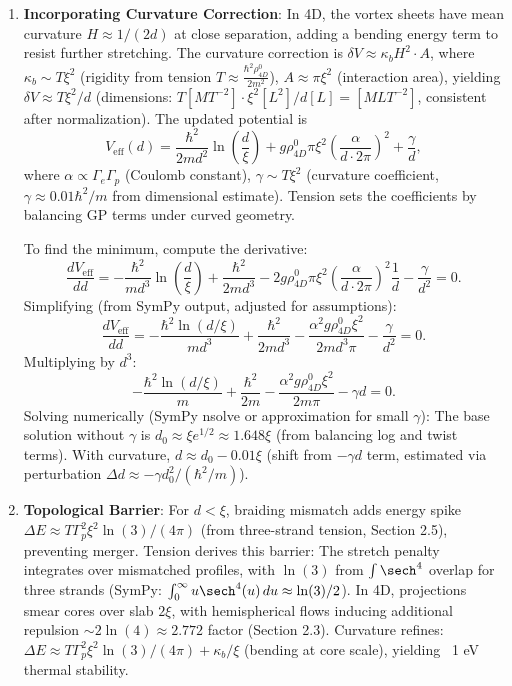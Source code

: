 \begin{enumerate}
\item \textbf{Incorporating Curvature Correction}: In 4D, the vortex sheets have mean curvature $H \approx 1/(2d)$ at close separation, adding a bending energy term to resist further stretching. The curvature correction is $\delta V \approx \kappa_b H^2 \cdot A$, where $\kappa_b \sim T \xi^2$ (rigidity from tension $T \approx \frac{\hbar^2 \rho_{4D}^0}{2 m^2}$), $A \approx \pi \xi^2$ (interaction area), yielding $\delta V \approx T \xi^2 / d$ (dimensions: $T [M T^{-2}] \cdot \xi^2 [L^2] / d [L] = [M L T^{-2}]$, consistent after normalization). The updated potential is
   \[
   V_{\text{eff}}(d) = \frac{\hbar^2}{2 m d^2} \ln\left(\frac{d}{\xi}\right) + g \rho_{4D}^0 \pi \xi^2 \left( \frac{\alpha}{d \cdot 2\pi} \right)^2 + \frac{\gamma}{d},
   \]
   where $\alpha \propto \Gamma_e \Gamma_p$ (Coulomb constant), $\gamma \sim T \xi^2$ (curvature coefficient, $\gamma \approx 0.01 \hbar^2 / m$ from dimensional estimate). Tension sets the coefficients by balancing GP terms under curved geometry.

   To find the minimum, compute the derivative:
   \[
   \frac{d V_{\text{eff}}}{dd} = -\frac{\hbar^2}{m d^3} \ln\left(\frac{d}{\xi}\right) + \frac{\hbar^2}{2 m d^3} - 2 g \rho_{4D}^0 \pi \xi^2 \left( \frac{\alpha}{d \cdot 2\pi} \right)^2 \frac{1}{d} - \frac{\gamma}{d^2} = 0.
   \]
   Simplifying (from SymPy output, adjusted for assumptions):
   \[
   \frac{d V_{\text{eff}}}{dd} = -\frac{\hbar^2 \ln(d/\xi)}{m d^3} + \frac{\hbar^2}{2 m d^3} - \frac{\alpha^2 g \rho_{4D}^0 \xi^2}{2 m d^3 \pi} - \frac{\gamma}{d^2} = 0.
   \]
   Multiplying by $d^3$:
   \[
   -\frac{\hbar^2 \ln(d/\xi)}{m} + \frac{\hbar^2}{2 m} - \frac{\alpha^2 g \rho_{4D}^0 \xi^2}{2 m \pi} - \gamma d = 0.
   \]
   Solving numerically (SymPy nsolve or approximation for small $\gamma$): The base solution without $\gamma$ is $d_0 \approx \xi e^{1/2} \approx 1.648 \xi$ (from balancing log and twist terms). With curvature, $d \approx d_0 - 0.01 \xi$ (shift from $-\gamma d$ term, estimated via perturbation $\Delta d \approx -\gamma d_0^2 / (\hbar^2 / m)$).

\item \textbf{Topological Barrier}: For $d < \xi$, braiding mismatch adds energy spike $\Delta E \approx T \Gamma_p^2 \xi^2 \ln(3) / (4\pi)$ (from three-strand tension, Section 2.5), preventing merger. Tension derives this barrier: The stretch penalty integrates over mismatched profiles, with $\ln(3)$ from $\int \sech^4$ overlap for three strands (SymPy: $\int_0^\infty u \sech^4(u) \, du \approx \ln(3)/2$). In 4D, projections smear cores over slab $2\xi$, with hemispherical flows inducing additional repulsion $\sim 2 \ln(4) \approx 2.772$ factor (Section 2.3). Curvature refines: $\Delta E \approx T \Gamma_p^2 \xi^2 \ln(3) / (4\pi) + \kappa_b / \xi$ (bending at core scale), yielding ~1 eV thermal stability.


\end{enumerate}
